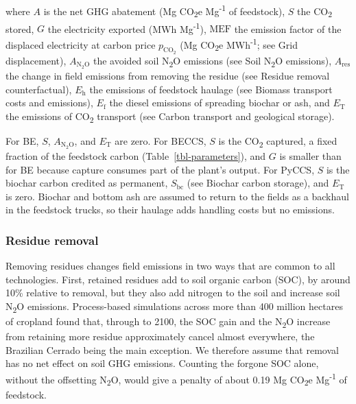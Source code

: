 \documentclass[
  letterpaper,
  twoside,
  twocolumn,
  9pt]{article}
\begin{document}
where \(A\) is the net GHG abatement (Mg CO\textsubscript{2}e
Mg\textsuperscript{-1} of feedstock), \(S\) the CO\textsubscript{2}
stored, \(G\) the electricity exported (MWh Mg\textsuperscript{-1}),
\(\mathrm{MEF}\) the emission factor of the displaced electricity at
carbon price \(p_{\mathrm{CO_2}}\) (Mg CO\textsubscript{2}e
MWh\textsuperscript{-1}; see Grid displacement), \(A_{\mathrm{N_2O}}\)
the avoided soil N\textsubscript{2}O emissions (see Soil
N\textsubscript{2}O emissions), \(A_{\mathrm{res}}\) the change in field
emissions from removing the residue (see Residue removal
counterfactual), \(E_{\mathrm{h}}\) the emissions of feedstock haulage
(see Biomass transport costs and emissions), \(E_{\mathrm{f}}\) the
diesel emissions of spreading biochar or ash, and \(E_{\mathrm{T}}\) the
emissions of CO\textsubscript{2} transport (see Carbon transport and
geological storage).

For BE, \(S\), \(A_{\mathrm{N_2O}}\), and \(E_{\mathrm{T}}\) are zero.
For BECCS, \(S\) is the CO\textsubscript{2} captured, a fixed fraction
of the feedstock carbon (Table~\ref{tbl-parameters}), and \(G\) is
smaller than for BE because capture consumes part of the plant's output.
For PyCCS, \(S\) is the biochar carbon credited as permanent,
\(S_{\mathrm{bc}}\) (see Biochar carbon storage), and \(E_{\mathrm{T}}\)
is zero. Biochar and bottom ash are assumed to return to the fields as a
backhaul in the feedstock trucks, so their haulage adds handling costs
but no emissions.

\subsubsection{Residue removal}\label{residue-removal}

Removing residues changes field emissions in two ways that are common to
all technologies. First, retained residues add to soil organic carbon
(SOC), by around 10\% relative to removal,\citep{bolinder2020} but they
also add nitrogen to the soil and increase soil N\textsubscript{2}O
emissions. Process-based simulations across more than 400 million
hectares of cropland found that, through to 2100, the SOC gain and the
N\textsubscript{2}O increase from retaining more residue approximately
cancel almost everywhere, the Brazilian Cerrado being the main
exception.\citep{mcclelland2025} We therefore assume that removal has no
net effect on soil GHG emissions. Counting the forgone SOC alone,
without the offsetting N\textsubscript{2}O, would give a penalty of
about 0.19 Mg CO\textsubscript{2}e Mg\textsuperscript{-1} of feedstock.
\end{document}
